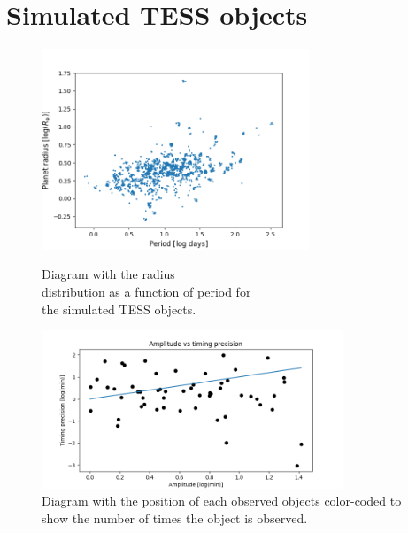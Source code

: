 \documentclass[12pt]{report}
\begin{document}

\section{Simulated TESS objects}

\begin{figure}
	\centering
	\begin{minipage}{.5\textwidth}
 	 \centering
 	 \includegraphics[width=8cm]{img/R_P-plot_5.png}
 	 \caption{Diagram with the radius \\distribution as a function of period for\\ the simulated TESS objects.}
 	 \label{fig:RP_plot}
	\end{minipage}%
	\begin{minipage}{.5\textwidth}
 	 \centering
	  \includegraphics[width=9cm]{img/ampErrorLog.png}
	  \caption{Diagram with the position of each observed objects color-coded to show the number of times the object is observed.}
	 \label{fig:pos_num_obs}
	\end{minipage}
\end{figure}
\end{document}
